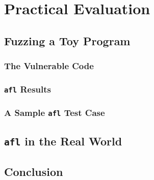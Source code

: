\chapter{Practical Evaluation}


\section{Fuzzing a Toy Program}

\subsection{The Vulnerable Code}

\subsection{\texttt{afl} Results}

\subsection{A Sample \texttt{afl} Test Case}

\section{\texttt{afl} in the Real World}


\section{Conclusion}

